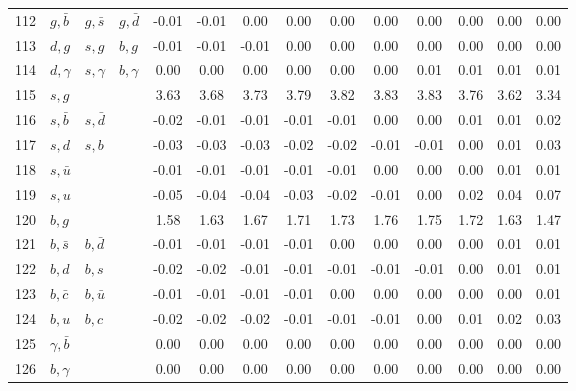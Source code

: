 \begin{tabularx}{\textwidth}{rXXX@{}S@{}S@{}S@{}S@{}S@{}S@{}S@{}S@{}S@{}S}
112 & $g, \bar b$      & $g, \bar s$       & $g, \bar d$      & -0.01 & -0.01 &  0.00 &  0.00 &  0.00 &  0.00 &  0.00 &  0.00 &  0.00 &  0.00 \\
113 & $d, g$           & $s,  g$           & $b,  g$          & -0.01 & -0.01 & -0.01 &  0.00 &  0.00 &  0.00 &  0.00 &  0.00 &  0.00 &  0.00 \\
114 & $d, \gamma$      & $s, \gamma$       & $b, \gamma$      &  0.00 &  0.00 &  0.00 &  0.00 &  0.00 &  0.00 &  0.01 &  0.01 &  0.01 &  0.01 \\
115 & $s, g$           &                   &                  &  3.63 &  3.68 &  3.73 &  3.79 &  3.82 &  3.83 &  3.83 &  3.76 &  3.62 &  3.34 \\
116 & $s, \bar b$      & $s, \bar d$       &                  & -0.02 & -0.01 & -0.01 & -0.01 & -0.01 &  0.00 &  0.00 &  0.01 &  0.01 &  0.02 \\
117 & $s, d$           & $s,  b$           &                  & -0.03 & -0.03 & -0.03 & -0.02 & -0.02 & -0.01 & -0.01 &  0.00 &  0.01 &  0.03 \\
118 & $s, \bar u$      &                   &                  & -0.01 & -0.01 & -0.01 & -0.01 & -0.01 &  0.00 &  0.00 &  0.00 &  0.01 &  0.01 \\
119 & $s, u$           &                   &                  & -0.05 & -0.04 & -0.04 & -0.03 & -0.02 & -0.01 &  0.00 &  0.02 &  0.04 &  0.07 \\
120 & $b, g$           &                   &                  &  1.58 &  1.63 &  1.67 &  1.71 &  1.73 &  1.76 &  1.75 &  1.72 &  1.63 &  1.47 \\
121 & $b, \bar s$      & $b, \bar d$       &                  & -0.01 & -0.01 & -0.01 & -0.01 &  0.00 &  0.00 &  0.00 &  0.00 &  0.01 &  0.01 \\
122 & $b, d$           & $b,  s$           &                  & -0.02 & -0.02 & -0.01 & -0.01 & -0.01 & -0.01 & -0.01 &  0.00 &  0.01 &  0.01 \\
123 & $b, \bar c$      & $b, \bar u$       &                  & -0.01 & -0.01 & -0.01 & -0.01 &  0.00 &  0.00 &  0.00 &  0.00 &  0.00 &  0.01 \\
124 & $b, u$           & $b,  c$           &                  & -0.02 & -0.02 & -0.02 & -0.01 & -0.01 & -0.01 &  0.00 &  0.01 &  0.02 &  0.03 \\
125 & $\gamma, \bar b$ &                   &                  &  0.00 &  0.00 &  0.00 &  0.00 &  0.00 &  0.00 &  0.00 &  0.00 &  0.00 &  0.00 \\
126 & $b, \gamma$      &                   &                  &  0.00 &  0.00 &  0.00 &  0.00 &  0.00 &  0.00 &  0.00 &  0.00 &  0.00 &  0.00 \\

\end{tabularx}

